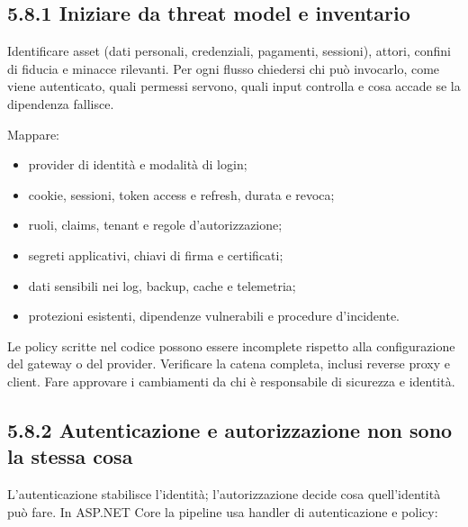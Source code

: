 \documentclass[
  italian,
  10pt,
]{book}
\providecommand{\tightlist}{%
  \setlength{\itemsep}{0pt}\setlength{\parskip}{0pt}}
\begin{document}
\subsection{5.8.1 Iniziare da threat model e
inventario}\label{iniziare-da-threat-model-e-inventario}

Identificare asset (dati personali, credenziali, pagamenti, sessioni),
attori, confini di fiducia e minacce rilevanti. Per ogni flusso
chiedersi chi può invocarlo, come viene autenticato, quali permessi
servono, quali input controlla e cosa accade se la dipendenza fallisce.

Mappare:

\begin{itemize}
\tightlist
\item
  provider di identità e modalità di login;
\item
  cookie, sessioni, token access e refresh, durata e revoca;
\item
  ruoli, claims, tenant e regole d'autorizzazione;
\item
  segreti applicativi, chiavi di firma e certificati;
\item
  dati sensibili nei log, backup, cache e telemetria;
\item
  protezioni esistenti, dipendenze vulnerabili e procedure d'incidente.
\end{itemize}

Le policy scritte nel codice possono essere incomplete rispetto alla
configurazione del gateway o del provider. Verificare la catena
completa, inclusi reverse proxy e client. Fare approvare i cambiamenti
da chi è responsabile di sicurezza e identità.

\subsection{5.8.2 Autenticazione e autorizzazione non sono la stessa
cosa}\label{autenticazione-e-autorizzazione-non-sono-la-stessa-cosa}

L'autenticazione stabilisce l'identità; l'autorizzazione decide cosa
quell'identità può fare. In ASP.NET Core la pipeline usa handler di
autenticazione e policy:
\end{document}
